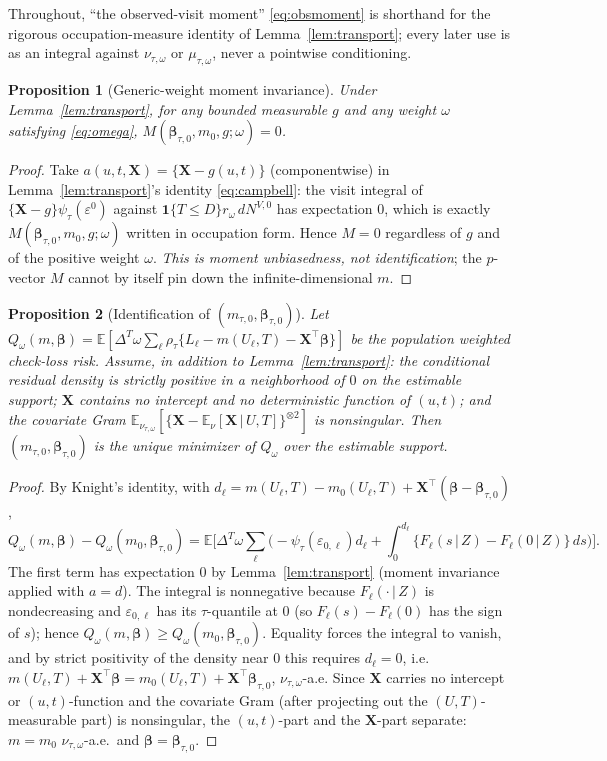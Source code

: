 \documentclass[11pt]{article}
\newtheorem{proposition}{Proposition}
\theoremstyle{remark}\newtheorem{remark}{Remark}
\newcommand{\E}{\mathbb{E}}
\newcommand{\X}{\bm{X}}
\newcommand{\bbeta}{\bm{\beta}}
\newcommand{\indc}[1]{\mathbf{1}\{#1\}}
\newcommand{\given}{\,\vert\,}
\begin{document}
\noindent Throughout, ``the observed-visit moment'' \eqref{eq:obsmoment} is
shorthand for the rigorous occupation-measure identity of
Lemma~\ref{lem:transport}; every later use is as an integral against
$\nu_{\tau,\omega}$ or $\mu_{\tau,\omega}$, never a pointwise conditioning.

\begin{proposition}[Generic-weight moment invariance]\label{prop:id}
Under Lemma~\ref{lem:transport}, for \emph{any} bounded measurable $g$ and
\emph{any} weight $\omega$ satisfying \eqref{eq:omega},
$M(\bbeta_{\tau,0},m_0,g;\omega)=0$.
\end{proposition}
\begin{proof}
Take $a(u,t,\X)=\{\X-g(u,t)\}$ (componentwise) in
Lemma~\ref{lem:transport}'s identity \eqref{eq:campbell}: the visit integral of
$\{\X-g\}\psi_\tau(\varepsilon^0)$ against $\indc{T\le D}r_\omega\,dN^{V,0}$ has
expectation $0$, which is exactly $M(\bbeta_{\tau,0},m_0,g;\omega)$ written in
occupation form. Hence $M=0$ regardless of $g$ and of the positive weight
$\omega$. \emph{This is moment unbiasedness, not identification}; the $p$-vector
$M$ cannot by itself pin down the infinite-dimensional $m$.
\end{proof}

\begin{proposition}[Identification of $(m_{\tau,0},\bbeta_{\tau,0})$]\label{prop:identif}
Let $Q_\omega(m,\bbeta)=\E[\Delta^T\omega\sum_\ell\rho_\tau\{L_\ell-m(U_\ell,T)
-\X^\top\bbeta\}]$ be the population weighted check-loss risk. Assume, in
addition to Lemma~\ref{lem:transport}: the conditional residual density is
strictly positive in a neighborhood of $0$ on the estimable support; $\X$
contains no intercept and no deterministic function of $(u,t)$; and the
covariate Gram $\E_{\nu_{\tau,\omega}}[\{\X-\E_{\nu}[\X\given U,T]\}^{\otimes2}]$
is nonsingular. Then $(m_{\tau,0},\bbeta_{\tau,0})$ is the unique minimizer of
$Q_\omega$ over the estimable support.
\end{proposition}
\begin{proof}
By Knight's identity, with $d_\ell=m(U_\ell,T)-m_0(U_\ell,T)+\X^\top
(\bbeta-\bbeta_{\tau,0})$,
\[
Q_\omega(m,\bbeta)-Q_\omega(m_0,\bbeta_{\tau,0})
=\E\Big[\Delta^T\omega\sum_\ell\Big(-\psi_\tau(\varepsilon_{0,\ell})d_\ell
   +\int_0^{d_\ell}\{F_\ell(s\given Z)-F_\ell(0\given Z)\}\,ds\Big)\Big].
\]
The first term has expectation $0$ by Lemma~\ref{lem:transport} (moment
invariance applied with $a=d$). The integral is nonnegative because
$F_\ell(\cdot\given Z)$ is nondecreasing and $\varepsilon_{0,\ell}$ has its
$\tau$-quantile at $0$ (so $F_\ell(s)-F_\ell(0)$ has the sign of $s$); hence
$Q_\omega(m,\bbeta)\ge Q_\omega(m_0,\bbeta_{\tau,0})$. Equality forces the
integral to vanish, and by strict positivity of the density near $0$ this
requires $d_\ell=0$, i.e.\ $m(U_\ell,T)+\X^\top\bbeta=m_0(U_\ell,T)
+\X^\top\bbeta_{\tau,0}$, $\nu_{\tau,\omega}$-a.e. Since $\X$ carries no intercept
or $(u,t)$-function and the covariate Gram (after projecting out the
$(U,T)$-measurable part) is nonsingular, the $(u,t)$-part and the $\X$-part
separate: $m=m_0$ $\nu_{\tau,\omega}$-a.e.\ and $\bbeta=\bbeta_{\tau,0}$.
\end{proof}
\end{document}

